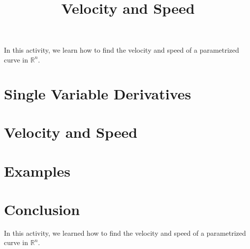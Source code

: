 \documentclass{ximera}
\title{Velocity and Speed}
\begin{document}
\begin{abstract}
\end{abstract}
\maketitle

In this activity, we learn how to find the velocity and speed of a parametrized curve in $\mathbb{R}^n$.

\section{Single Variable Derivatives}



\section{Velocity and Speed}



\section{Examples}



\section{Conclusion}

In this activity, we learned how to find the velocity and speed of a parametrized curve in $\mathbb{R}^n$.
\end{document}
